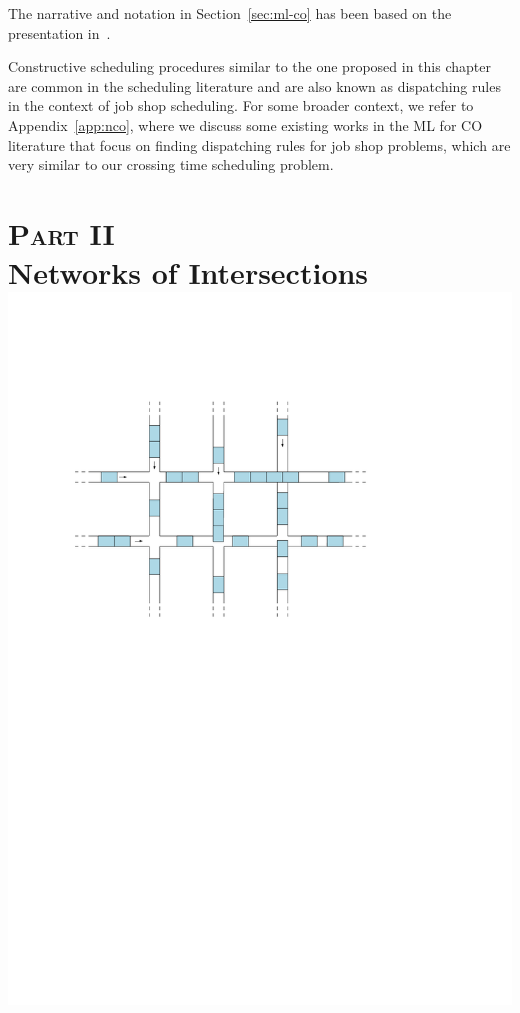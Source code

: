 \documentclass[a4paper]{report}
\theoremstyle{definition}
\theoremstyle{plain}
\begin{document}
The narrative and notation in Section~\ref{sec:ml-co} has been based on the
presentation in~\cite{bengioMachineLearningCombinatorial2020}.

Constructive scheduling procedures similar to the one proposed in this chapter
are common in the scheduling literature and are also known as dispatching rules
in the context of job shop scheduling. For some broader context, we refer to
Appendix~\ref{app:nco}, where we discuss some existing works in the ML for CO
literature that focus on finding dispatching rules for job shop problems, which
are very similar to our crossing time scheduling problem.


\part*{\hspace{-0.8em}\textsc{Part II}\\[0.6em] Networks of Intersections\\[3em]
       \centering\includegraphics[scale=1]{figures/network-intersections}}
\end{document}
